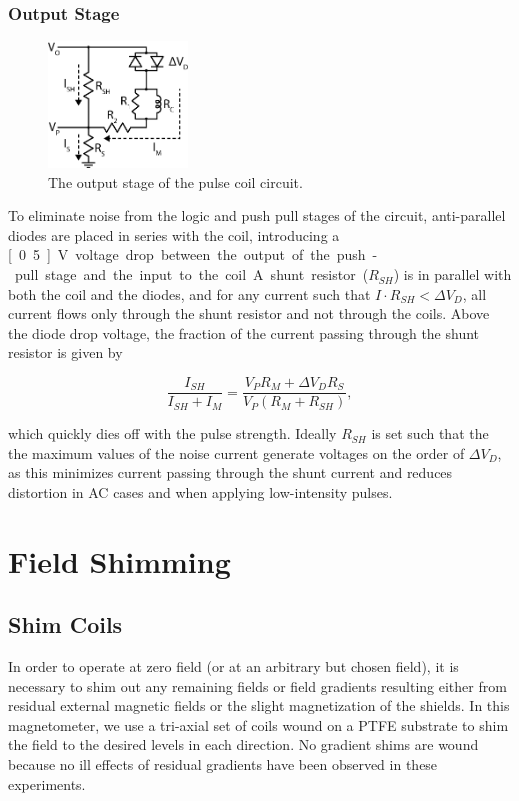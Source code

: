 \documentclass[PaulGanssle-Thesis.tex]{subfiles}
\begin{document}
\subsubsection{Output Stage}
\label{pulse.circuit.output}
\begin{figure}
\includegraphics[width=0.33\textwidth]{figures/magnetometer/PulseCoilCircuitOutputStage.eps}
\caption{The output stage of the pulse coil circuit.}
\label{fig:pulse.circuit.outputstage}
\vspace{-0.1\lineheight}
\end{figure}

To eliminate noise from the logic and push pull stages of the circuit, anti-parallel diodes are placed in series with the coil, introducing a \unit[0.5]{V} voltage drop between the output of the push-pull stage and the input to the coil. A shunt resistor ($R_{SH}$) is in parallel with both the coil and the diodes, and for any current such that $I\cdot R_{SH} < \Delta V_{D}$, all current flows only through the shunt resistor and not through the coils. Above the diode drop voltage, the fraction of the current passing through the shunt resistor is given by

\begin{equation}
\label{eqn:pulse.coil.circuit.shunt.current.alt}
\frac{I_{SH}}{I_{SH} + I_{M}} = \frac{V_{P}R_{M} + \Delta V_{D}R_{S}}{V_{P}(R_{M} + R_{SH})},
\end{equation}

which quickly dies off with the pulse strength. Ideally $R_{SH}$ is set such that the the maximum values of the noise current generate voltages on the order of $\Delta V_D$, as this minimizes current passing through the shunt current and reduces distortion in AC cases and when applying low-intensity pulses.

\section{Field Shimming}
\label{mag.design.shimming}
\subsection{Shim Coils}
\label{mag.design.shim.coils}
In order to operate at zero field (or at an arbitrary but chosen field), it is necessary to shim out any remaining fields or field gradients resulting either from residual external magnetic fields or the slight magnetization of the shields. In this magnetometer, we use a tri-axial set of coils wound on a PTFE substrate to shim the field to the desired levels in each direction. No gradient shims are wound because no ill effects of residual gradients have been observed in these experiments.
\end{document}
